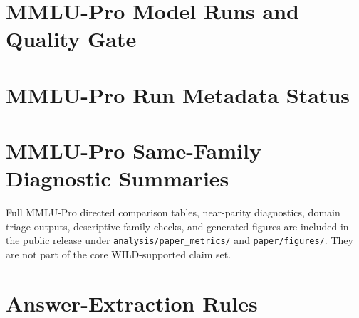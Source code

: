 \documentclass[manuscript, screen, review, nonacm]{jair}
\begin{document}
\section{MMLU-Pro Model Runs and Quality Gate}

\begin{table}[H]
\centering
\small
\resizebox{\linewidth}{!}{}
\caption{Model-level leaderboard and quality-gate status for the archived MMLU-Pro outputs. Accuracy and answered values are percentages over the same 3,008-item set.}
\label{tab:model-quality-gate}
\end{table}

\section{MMLU-Pro Run Metadata Status}

\begin{table}[H]
\centering
\small
\resizebox{\linewidth}{!}{}
\caption{Run-metadata completeness in the archived MMLU-Pro raw-output files.}
\label{tab:model-run-metadata}
\end{table}

\section{MMLU-Pro Same-Family Diagnostic Summaries}

\begin{table}[H]
\centering
\small
\resizebox{\linewidth}{!}{}
\caption{Primary MMLU-Pro same-family diagnostic accounting after excluding runs with answered rate below 80\%. Values are percentages. $I$ is improvement mass, $R$ is regression mass, and NRB is normalized regression burden.}
\label{tab:mmlu-family}
\end{table}

Full MMLU-Pro directed comparison tables, near-parity diagnostics, domain triage outputs, descriptive family checks, and generated figures are included in the public release under \texttt{analysis/paper\_metrics/} and \texttt{paper/figures/}. They are not part of the core WILD-supported claim set.

\section{Answer-Extraction Rules}
\label{app:parser-rules}
\end{document}
